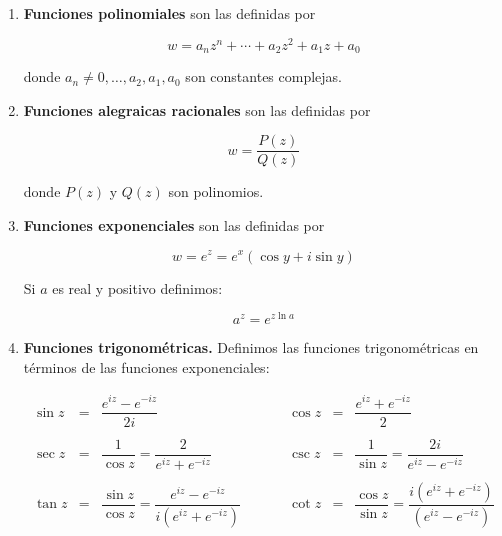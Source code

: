 \documentclass[12pt]{book}
\begin{document}
\begin{enumerate}

\item \textbf{Funciones polinomiales} son las definidas por

\begin{equation}
w = a_n z^n + \cdots + a_2 z^2 + a_1 z + a_0
\end{equation}

donde $a_n \neq 0, \ldots, a_2, a_1, a_0$ son constantes complejas.

\item \textbf{Funciones alegraicas racionales} son las definidas por 

\begin{equation}
w  = \dfrac{P(z)}{Q(z)}
\end{equation}

donde $P(z)$ y $Q(z)$ son polinomios.

\item \textbf{Funciones exponenciales} son las definidas por 

\begin{equation}
w = e^z = e^x (\cos y + i \sin y)
\end{equation}

Si $a$ es real y positivo definimos:

\begin{equation}
a^z = e^{z \ln a}
\end{equation}

\item \textbf{Funciones trigonométricas.} Definimos las funciones trigonométricas en términos de las funciones exponenciales:

\begin{equation}
\begin{array}{cclccclc}

\sin z & = & \dfrac{e^{iz}-e^{-iz}}{2i} & \ \ \ \ \ \ \ \ & \cos z & = & \dfrac{e^{iz} + e^{-iz}}{2} \\ \\

\sec z & = & \dfrac{1}{\cos z} = \dfrac{2}{e^{iz}+e^{-iz}} & \ & \csc z& = & \dfrac{1}{\sin z} = \dfrac{2i}{e^{iz}-e^{-iz}} \\ \\

\tan z & = & \dfrac{\sin z}{\cos z} = \dfrac{e^{iz}-e^{-iz} }{i (e^{iz}+e^{-iz})} & & \cot z & = & \dfrac{\cos z}{\sin z} = \dfrac{i(e^{iz}+e^{-iz})}{(e^{iz}-e^{-iz})} 

\end{array}
\end{equation}


\end{enumerate}
\end{document}
